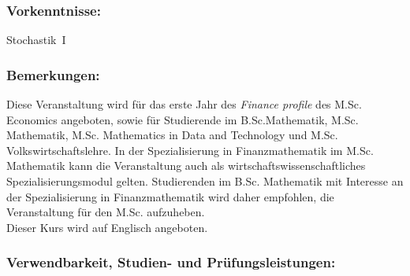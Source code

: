 \documentclass[a4paper,10pt]{article}
\begin{document}
\subsubsection*{\large
    Vorkenntnisse:
}
Stochastik~I
\subsubsection*{\large
    Bemerkungen:
}
Diese Veranstaltung wird für das erste Jahr des {\em Finance profile} des M.Sc. Economics angeboten, sowie für Studierende im B.Sc.Mathematik, M.Sc. Mathematik, M.Sc. Mathematics in Data and Technology und M.Sc. Volkswirtschaftslehre. In der Spezialisierung in Finanzmathematik im M.Sc. Mathematik kann die Veranstaltung auch als wirtschaftswissenschaftliches Spezialisierungsmodul gelten. Studierenden im B.Sc. Mathematik mit Interesse an der Spezialisierung in Finanzmathematik wird daher empfohlen, die Veranstaltung für den M.Sc. aufzuheben.\\ Dieser Kurs wird auf Englisch angeboten.
\cleardoublepage
\subsubsection*{\large
    Verwendbarkeit, Studien- und Prüfungsleistungen:
}
\end{document}
